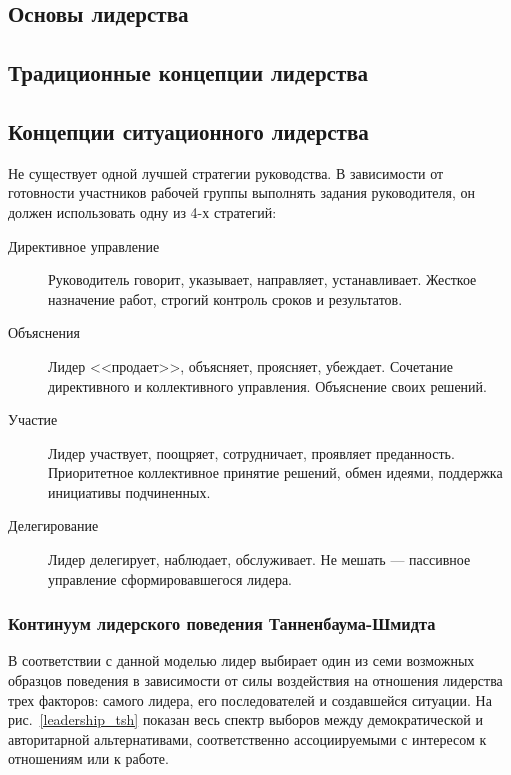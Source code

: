 \documentclass[a4paper,12pt,oneside,final]{extarticle}
\numberwithin{equation}{section}
\begin{document}
\subsection{Основы лидерства}

\subsection{Традиционные концепции лидерства}

\subsection{Концепции ситуационного лидерства}
Не существует одной лучшей стратегии руководства. 
В зависимости от готовности участников рабочей группы выполнять задания руководителя, он должен использовать одну из 4-х стратегий:
\begin{description}
	\item[Директивное управление] Руководитель говорит, указывает, направляет, устанавливает. 
	Жесткое назначение работ, строгий контроль сроков и результатов.
	\item[Объяснения] Лидер <<продает>>, объясняет, проясняет, убеждает. 
	Сочетание директивного и коллективного управления. 
	Объяснение своих решений.
	\item[Участие] Лидер участвует, поощряет, сотрудничает, проявляет преданность. 
	Приоритетное коллективное принятие решений, обмен идеями, поддержка инициативы подчиненных.
	\item[Делегирование] Лидер делегирует, наблюдает, обслуживает. 
	Не мешать --- пассивное управление сформировавшегося лидера.
\end{description}

\subsubsection{Континуум лидерского поведения Танненбаума-Шмидта}
В соответствии с данной моделью лидер выбирает один из семи возможных образцов поведения в зависимости от силы воздействия на отношения лидерства трех факторов: самого лидера, его последователей и создавшейся ситуации. 
На рис.~\ref{leadership_tsh} показан весь спектр выборов между демократической и авторитарной альтернативами, соответственно ассоциируемыми с интересом к отношениям или к работе.
\end{document}
